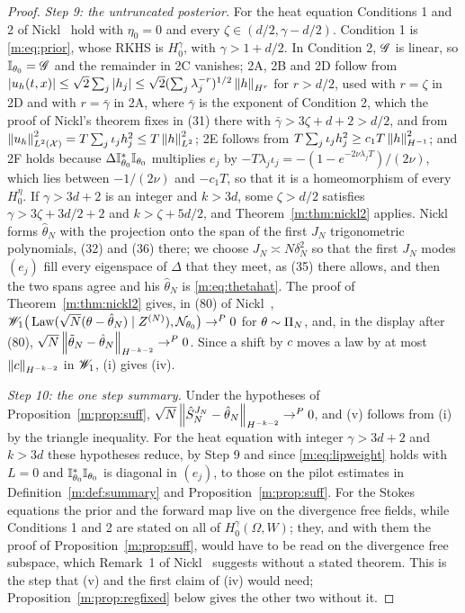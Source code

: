 \begin{proof}
\emph{Step 9: the untruncated posterior.} For the heat equation Conditions 1 and 2 of Nickl~\cite{nicklbvm2024} hold with $\eta_0=0$ and every $\zeta\in(d/2,\gamma-d/2)$. Condition 1 is \eqref{m:eq:prior}, whose RKHS is $H^\gamma_0$, with $\gamma>1+d/2$. In Condition 2, $\mathscr{G}$ is linear, so $\mathbb{I}_{\theta_0}=\mathscr{G}$ and the remainder in 2C vanishes; 2A, 2B and 2D follow from $|u_h(t,x)|\le\sqrt2\sum_j|h_j|\le\sqrt2(\sum_j\lambda_j^{-r})^{1/2}\left\|h\right\|_{H^r}$ for $r>d/2$, used with $r=\zeta$ in 2D and with $r=\bar\gamma$ in 2A, where $\bar\gamma$ is the exponent of Condition 2, which the proof of Nickl's theorem fixes in (31) there with $\bar\gamma>3\zeta+d+2>d/2$, and from $\left\|u_h\right\|^2_{L^2(\mathcal X)}=T\sum_j\iota_jh_j^2\le T\left\|h\right\|^2_{L^2}$; 2E follows from $T\sum_j\iota_jh_j^2\ge c_1T\left\|h\right\|^2_{H^{-1}}$; and 2F holds because $\Delta\mathbb{I}^*_{\theta_0}\mathbb{I}_{\theta_0}$ multiplies $e_j$ by $-T\lambda_j\iota_j=-(1-e^{-2\nu\lambda_jT})/(2\nu)$, which lies between $-1/(2\nu)$ and $-c_1T$, so that it is a homeomorphism of every $H^\eta_0$. If $\gamma>3d+2$ is an integer and $k>3d$, some $\zeta>d/2$ satisfies $\gamma>3\zeta+3d/2+2$ and $k>\zeta+5d/2$, and Theorem~\ref{m:thm:nickl2} applies. Nickl forms $\hat\theta_N$ with the projection onto the span of the first $J_N$ trigonometric polynomials, (32) and (36) there; we choose $J_N\asymp N\delta_N^2$ so that the first $J_N$ modes $(e_j)$ fill every eigenspace of $\Delta$ that they meet, as (35) there allows, and then the two spans agree and his $\hat\theta_N$ is \eqref{m:eq:thetahat}. The proof of Theorem~\ref{m:thm:nickl2} gives, in (80) of Nickl~\cite{nicklbvm2024}, $\mathscr{W}_1\big(\operatorname{Law}(\sqrt N(\theta-\hat\theta_N)\mid Z^{(N)}),\mathcal{N}_{\theta_0}\big)\to^P0$ for $\theta\sim\Pi_N$, and, in the display after (80), $\sqrt N\left\|\tilde\theta_N-\hat\theta_N\right\|_{H^{-k-2}}\to^P0$. Since a shift by $c$ moves a law by at most $\left\|c\right\|_{H^{-k-2}}$ in $\mathscr{W}_1$, (i) gives (iv).

\emph{Step 10: the one step summary.} Under the hypotheses of Proposition~\ref{m:prop:suff}, $\sqrt N\left\|\hat S^{J_N}_N-\hat\theta_N\right\|_{H^{-k-2}}\to^P0$, and (v) follows from (i) by the triangle inequality. For the heat equation with integer $\gamma>3d+2$ and $k>3d$ these hypotheses reduce, by Step 9 and since \eqref{m:eq:lipweight} holds with $L=0$ and $\mathbb{I}^*_{\theta_0}\mathbb{I}_{\theta_0}$ is diagonal in $(e_j)$, to those on the pilot estimates in Definition~\ref{m:def:summary} and Proposition~\ref{m:prop:suff}. For the Stokes equations the prior and the forward map live on the divergence free fields, while Conditions 1 and 2 are stated on all of $H^\gamma_0(\Omega,W)$; they, and with them the proof of Proposition~\ref{m:prop:suff}, would have to be read on the divergence free subspace, which Remark~1 of Nickl~\cite{nicklbvm2024} suggests without a stated theorem. This is the step that (v) and the first claim of (iv) would need; Proposition~\ref{m:prop:regfixed} below gives the other two without it.
\end{proof}

